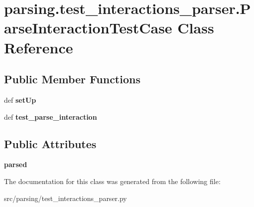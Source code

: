 \hypertarget{classparsing_1_1test__interactions__parser_1_1_parse_interaction_test_case}{\section{parsing.\-test\-\_\-interactions\-\_\-parser.\-Parse\-Interaction\-Test\-Case \-Class \-Reference}
\label{classparsing_1_1test__interactions__parser_1_1_parse_interaction_test_case}
}
\subsection*{\-Public \-Member \-Functions}
\begin{DoxyCompactItemize}
\item 
\hypertarget{classparsing_1_1test__interactions__parser_1_1_parse_interaction_test_case_a5ba61b8efc002e84f959ccf36d836b74}{def {\bfseries set\-Up}}\label{classparsing_1_1test__interactions__parser_1_1_parse_interaction_test_case_a5ba61b8efc002e84f959ccf36d836b74}

\item 
\hypertarget{classparsing_1_1test__interactions__parser_1_1_parse_interaction_test_case_a1433a31983d1b48f2061b2501376a857}{def {\bfseries test\-\_\-parse\-\_\-interaction}}\label{classparsing_1_1test__interactions__parser_1_1_parse_interaction_test_case_a1433a31983d1b48f2061b2501376a857}

\end{DoxyCompactItemize}
\subsection*{\-Public \-Attributes}
\begin{DoxyCompactItemize}
\item 
\hypertarget{classparsing_1_1test__interactions__parser_1_1_parse_interaction_test_case_a96e976f84affc2aae04d92d22663b11e}{{\bfseries parsed}}\label{classparsing_1_1test__interactions__parser_1_1_parse_interaction_test_case_a96e976f84affc2aae04d92d22663b11e}

\end{DoxyCompactItemize}


\-The documentation for this class was generated from the following file\-:\begin{DoxyCompactItemize}
\item 
src/parsing/test\-\_\-interactions\-\_\-parser.\-py\end{DoxyCompactItemize}
